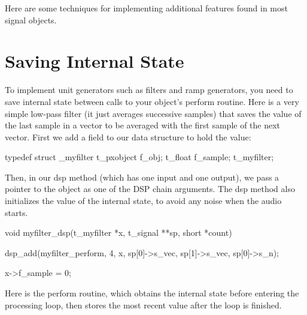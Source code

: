Here are some techniques for implementing additional features found in most signal objects.\hypertarget{chapter_msp_advanced_chapter_msp_advanced_internal_state}{}\section{Saving Internal State}\label{chapter_msp_advanced_chapter_msp_advanced_internal_state}
To implement unit generators such as filters and ramp generators, you need to save internal state between calls to your object's perform routine. Here is a very simple low-\/pass filter (it just averages successive samples) that saves the value of the last sample in a vector to be averaged with the first sample of the next vector. First we add a field to our data structure to hold the value:


\begin{DoxyCode}
    typedef struct _myfilter
    {
        t_pxobject f_obj;
        t_float f_sample;
    } t_myfilter;
\end{DoxyCode}


Then, in our dsp method (which has one input and one output), we pass a pointer to the object as one of the DSP chain arguments. The dsp method also initializes the value of the internal state, to avoid any noise when the audio starts.


\begin{DoxyCode}
    void myfilter_dsp(t_myfilter *x, t_signal **sp, short *count)
    {
        dsp_add(myfilter_perform, 4, x, sp[0]->s_vec, sp[1]->s_vec, sp[0]->s_n);
    
        x->f_sample = 0;
    }
\end{DoxyCode}


Here is the perform routine, which obtains the internal state before entering the processing loop, then stores the most recent value after the loop is finished.


